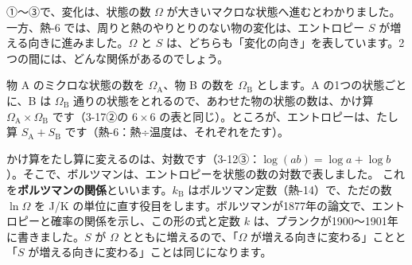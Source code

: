 \label{ph:熱-15:sec4}
①〜③で、変化は、状態の数 $\Omega$ が大きいマクロな状態へ進むとわかりました。一方、熱-6 では、周りと熱のやりとりのない物の変化は、エントロピー $S$ が増える向きに進みました。$\Omega$ と $S$ は、どちらも「変化の向き」を表しています。2つの間には、どんな関係があるのでしょう。

\noindent\begin{minipage}[c]{0.56\linewidth}\raggedright
物 A のミクロな状態の数を $\Omega_{\mathrm A}$、物 B の数を $\Omega_{\mathrm B}$ とします。A の1つの状態ごとに、B は $\Omega_{\mathrm B}$ 通りの状態をとれるので、あわせた物の状態の数は、かけ算 $\Omega_{\mathrm A}\times\Omega_{\mathrm B}$ です（3-17②の $6\times6$ の表と同じ）。ところが、エントロピーは、たし算 $S_{\mathrm A}+S_{\mathrm B}$ です（熱-6：熱÷温度は、それぞれをたす）。
\end{minipage}\hfill
\begin{minipage}[c]{0.4\linewidth}\centering
{}
\end{minipage}

\par\vspace{4pt}
かけ算をたし算に変えるのは、対数です（3-12③：$\log(ab)=\log a+\log b$）。そこで、ボルツマンは、エントロピーを状態の数の対数で表しました。
\label{ph:熱-15:boltzmann}これを\textbf{ボルツマンの関係}といいます。$k_{\mathrm B}$ はボルツマン定数（熱-14）で、ただの数 $\ln\Omega$ を J/K の単位に直す役目をします。ボルツマンが1877年の論文で、エントロピーと確率の関係を示し、この形の式と定数 $k$ は、プランクが1900〜1901年に書きました。$S$ が $\Omega$ とともに増えるので、「$\Omega$ が増える向きに変わる」ことと「$S$ が増える向きに変わる」ことは同じになります。

